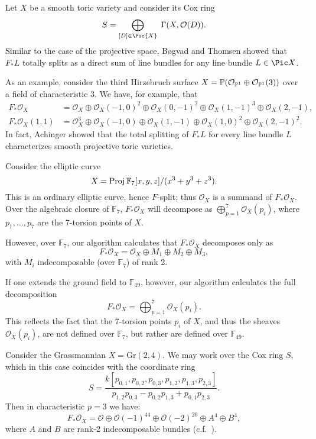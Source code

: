 \documentclass[12pt]{article}
\def\O{\mathcal O}
\numberwithin{equation}{section}
\theoremstyle{theorem}
\numberwithin{thm}{section}
\theoremstyle{definition}
\begin{document}
\begin{exa}
  Let $X$ be a smooth toric variety and consider its Cox ring
  \[ S = \bigoplus_{[D]\in\Pic{X}} \; \Gamma(X, \O(D)). \]
  Similar to the case of the projective space, B{\o}gvad and Thomsen \cite{Bogvad98,Thomsen00} showed that $F_*L$ totally splits as a direct sum of line bundles for any line bundle $L\in\Pic X$.

  As an example, consider the third Hirzebruch surface $X=\P(\O_{\P^1}\oplus \O_{\P^1}(3))$ over a field of characteristic 3. We have, for example, that
  \begin{align*}
    F_*\O_X      &= \O_X   \oplus \O_X(-1,0)^2 \oplus \O_X(0,-1)^2 \oplus \O_X(1,-1)^3 \oplus \O_X(2,-1), \\
    F_*\O_X(1,1) &= \O_X^3 \oplus \O_X(-1,0)   \oplus \O_X(1,-1)   \oplus \O_X(1, 0)^2 \oplus \O_X(2,-1)^2.
  \end{align*}
  In fact, Achinger \cite{Achinger15} showed that the total splitting of $F_*L$ for every line bundle $L$ characterizes smooth projective toric varieties.
\end{exa}

\begin{exa}\label{algclos}
  Consider the elliptic curve
  \[ X = \operatorname{Proj} \mathbb F_7[x,y,z]/(x^3+y^3+z^3). \]
  This is an ordinary elliptic curve, hence $F$-split; thus $\O_X$ is a summand of $F_* \O_X$. Over the algebraic closure of $\mathbb F_7$, $F_*\O_X$ will decompose as $\bigoplus_{p=1}^7 \O_X(p_i)$, where $p_1,\dots,p_7$ are the 7-torsion points of $X$.

  However, over $\mathbb F_7$, our algorithm calculates that $F_*\O_X$ decomposes only as
  $$ F_* \O_X =\O_X \oplus M_1\oplus M_2\oplus M_3, $$
  with $M_i$ indecomposable (over $\mathbb F_7$) of rank 2.

  If one extends the ground field to $\mathbb F_{49}$, however, our algorithm calculates the full decomposition
  $$ F_* \O_X=\bigoplus_{p=1}^7 \O_X(p_i). $$
  This reflects the fact that the 7-torsion points $p_i$ of $X$, and thus the sheaves $\O_X(p_i)$, are not defined over $\mathbb F_7$, but rather are defined over $\mathbb F_{49}$.
\end{exa}

\begin{exa}
  Consider the Grassmannian $X = \mathrm{Gr(2,4)}$. We may work over the Cox ring $S$,
  which in this case coincides with the coordinate ring
  \[ S = \frac{k[p_{0,1},p_{0,2},p_{0,3},p_{1,2},p_{1,3},p_{2,3}]}{p_{1,2}p_{0,3}-p_{0,2}p_{1,3}+p_{0,1}p_{2,3}}. \]
  Then in characteristic $p=3$ we have:
  \[ F_*\O_X = \O \oplus \O(-1)^{44} \oplus \O(-2)^{20} \oplus A^4 \oplus B^4, \]
  where $A$ and $B$ are rank-2 indecomposable bundles (c.f.~\cite{RSVdB22}).
\end{exa}
\end{document}
